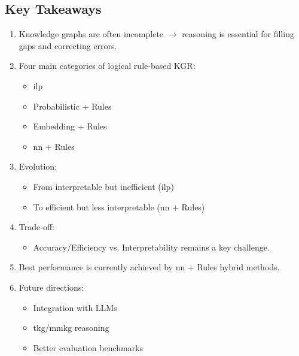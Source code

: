 \subsection*{Key Takeaways}
\begin{enumerate}
    \item Knowledge graphs are often incomplete $\rightarrow$ reasoning is essential for filling gaps and correcting errors.

    \item Four main categories of logical rule-based KGR:
    \begin{itemize}
        \item \gls{ilp}
        \item Probabilistic + Rules
        \item Embedding + Rules
        \item \gls{nn} + Rules
    \end{itemize}

    \item Evolution:
    \begin{itemize}
        \item From interpretable but inefficient (\gls{ilp})
        \item To efficient but less interpretable (\gls{nn} + Rules)
    \end{itemize}

    \item Trade-off:
    \begin{itemize}
        \item Accuracy/Efficiency vs.
        Interpretability remains a key challenge.
    \end{itemize}

    \item Best performance is currently achieved by \gls{nn} + Rules hybrid methods.

    \item Future directions:
    \begin{itemize}
        \item Integration with LLMs
        \item \gls{tkg}/\gls{mmkg} reasoning
        \item Better evaluation benchmarks
    \end{itemize}
\end{enumerate}

